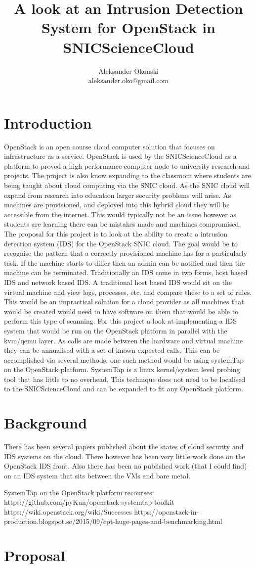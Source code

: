 \documentclass[12pt]{article}
\title{A look at an Intrusion Detection System for OpenStack in SNICScienceCloud}
\author{Aleksander Okonski \\ aleksander.oko@gmail.com}
\date{}
\begin{document}
\maketitle

\section{Introduction}
OpenStack is an open course cloud computer solution that focuses on infrastructure as a service. OpenStack is used by the SNICScienceCloud as a platform to proved a high performance computer node to university research and projects. The project is also know expanding to the classroom where students are being taught about cloud computing via the SNIC cloud. As the SNIC cloud will expand from research into education larger security problems will arise. As machines are provisioned, and deployed into this hybrid cloud they will be accessible from the internet. This would typically not be an issue however as students are learning there can be mistakes made and machines compromised. The proposal for this project is to look at the ability to create a intrusion detection system (IDS) for the OpenStack SNIC cloud. The goal would be to recognise the pattern that a correctly provisioned machine has for a particularly task. If the machine starts to differ then an admin can be notified and then the machine can be terminated. Traditionally an IDS come in two forms, host based IDS and network based IDS\@. A traditional host based IDS would sit on the virtual machine and view logs, processes, etc\@. and compare these to a set of rules. This would be an impractical solution for a cloud provider as all machines that would be created would need to have software on them that would be able to perform this type of scanning. For this project a look at implementing a IDS system that would be run on the OpenStack platform in parallel with the kvm/qemu layer. As calls are made between the hardware and virtual machine they can be annualised with a set of known expected calls. This can be accomplished via several methods, one such method would be using systemTap on the OpenStack platform. SystemTap is a linux kernel/system level probing tool that has little to no overhead. This technique does not need to be localised to the SNICScienceCloud and can be expanded to fit any OpenStack platform.

\section{Background}
There has been several papers published about the states of cloud security and IDS systems on the cloud. There however has been very little work done on the OpenStack IDS front. Also there has been no published work (that I could find) on an IDS system that sits between the VMs and bare metal.


SystemTap on the OpenStack platform recourses:
https://github.com/pyKun/openstack-systemtap-toolkit
https://wiki.openstack.org/wiki/Successes
https://openstack-in-production.blogspot.se/2015/09/ept-huge-pages-and-benchmarking.html


\section{Proposal}
\end{document}
